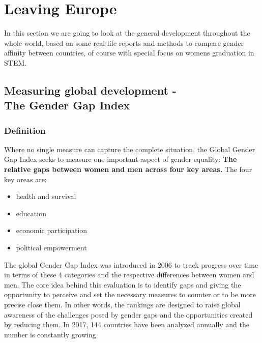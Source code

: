 	\section{Leaving Europe}
	In this section we are going to look at the general development throughout the whole world, based on some real-life reports and methods to compare gender affinity between countries, of course with special focus on womens graduation in STEM.
	
	\subsection{Measuring global development - \\The Gender Gap Index}
	
	\subsubsection{Definition}
	
	Where no single measure can capture the complete situation, the Global Gender Gap Index seeks to measure one important aspect of gender equality: \textbf{The relative gaps between women and men across four key areas.}
	The four key areas are: \cite{tgender}
	\begin{itemize}
		\item health and survival
		\item education
		\item economic participation
		\item political empowerment
	\end{itemize}
	The global Gender Gap Index was introduced in 2006 to track progress over time in terms of these 4 categories and the respective differences between women and men. The core idea behind this evaluation is to identify gaps and giving the opportunity to perceive and set the necessary measures to counter or to be more precise close them. In other words, the rankings are designed to raise global awareness of the challenges posed by gender gaps and the opportunities created by reducing them. In 2017, 144 countries have been analyzed annually and the number is constantly growing.
	
